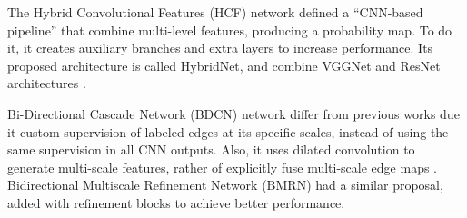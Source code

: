 
The Hybrid Convolutional Features (HCF) network \cite{LearningHybrid:Hu2018377} defined a ``CNN-based pipeline'' that combine multi-level features, producing a probability map.
To do it, it creates auxiliary branches and extra layers to increase performance.
Its proposed architecture is called HybridNet, and combine VGGNet and ResNet architectures \cite{LearningHybrid:Hu2018377}.

Bi-Directional Cascade Network (BDCN) network \cite{He:2019} differ from previous works due it custom supervision of labeled edges at its specific scales, instead of using the same supervision in all CNN outputs.
Also, it uses dilated convolution to generate multi-scale features, rather of explicitly fuse multi-scale edge maps \cite{He:2019}.
Bidirectional Multiscale Refinement Network (BMRN) \cite{Bao:2022} had a similar proposal, added with refinement blocks to achieve better performance.

%

